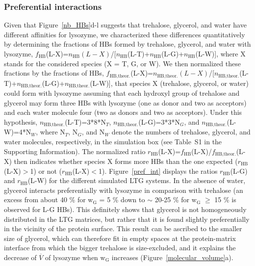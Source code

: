 \documentclass[journal=jpcbfk,manuscript=article]{achemso}
\begin{document}
\begin{singlespacing}
\newpage

\subsubsection{Preferential interactions}

Given that Figure~\ref{nb_HBs}d-l suggests that trehalose, glycerol, and water have different affinities for lysozyme, 
we characterized these differences quantitatively by determining the fractions of HBs formed by trehalose, 
glycerol, and water with lysozyme, 
$f_{\textrm{HB}}$(L-X)=$n_{\textrm{HB}}(L-X)$/[$n_{\textrm{HB}}$(L-T)+$n_{\textrm{HB}}$(L-G)+$n_{\textrm{HB}}$(L-W)],
where X stands for the considered species (X = T, G, or W). We then normalized these fractions by the fractions
of HBs, $f_{\textrm{HB,theor.}}$(L-X)=$n_{\textrm{HB,theor.}}(L-X)$/[$n_{\textrm{HB,theor.}}$(L-T)+$n_{\textrm{HB,theor.}}$(L-G)+$n_{\textrm{HB,theor.}}$(L-W)], 
that species X (trehalose, glycerol, or water) could form with lysozyme assuming that
each hydroxyl group of trehalose and glycerol may form three HBs with lysozyme (one as donor and two as acceptors) and
each water molecule four (two as donors and two as acceptors). 
Under this hypothesis, $n_{\textrm{HB,theor.}}$(L-T)=3*8*N$_{T}$, $n_{\textrm{HB,theor.}}$(L-G)=3*3*N$_{G}$, 
and $n_{\textrm{HB,theor.}}$(L-W)=4*N$_{W}$, where N$_{T}$, N$_{G}$, and N$_{W}$ denote the numbers of trehalose, glycerol,
and water molecules, respectively, in the simulation box (see Table~S1 in the Supporting Information).
The normalized ratio 
$r_{\textrm{HB}}$(L-X)=$f_{\textrm{HB}}$(L-X)/$f_{\textrm{HB,theor.}}$(L-X) then indicates whether species X forms more HBs than
the one expected ($r_{\textrm{HB}}$(L-X)$>$1) or not ($r_{\textrm{HB}}$(L-X)$<$1). Figure~\ref{pref_int} displays the
ratios $r_{\textrm{HB}}$(L-G) and $r_{\textrm{HB}}$(L-W) for the different simulated LTG systems. In the absence of water, 
glycerol interacts preferentially with lysozyme in comparison with trehalose (an excess from about 40 \% for 
w$_{\textrm{G}}$ = 5 \% down to $\sim$ 20-25 \% for w$_{\textrm{G}}$ $\geq$ 15 \% is observed for L-G HBs). This definitely shows that glycerol is not 
homogeneously distributed in the LTG matrices, but rather that it is found slightly preferentially in the vicinity of the 
protein surface. This result can be ascribed to the smaller size of glycerol, which can therefore fit in empty spaces at 
the protein-matrix interface from which the bigger trehalose is size-excluded, and it explains the decrease of 
$\overline{V}$ of lysozyme when w$_{\textrm{G}}$ increases (Figure~\ref{molecular_volume}a). 

\end{singlespacing}
\end{document}
